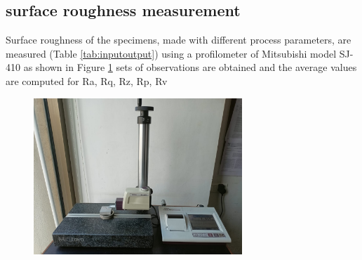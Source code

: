 \documentclass[suppldata]{interact}
\begin{document}
\newpage 
\subsection {surface roughness measurement}
  Surface roughness of the specimens, made with different process parameters, are measured (Table \ref{tab:inputoutput})  using a profilometer of Mitsubishi model SJ-410 as shown in Figure \ref{fig:profilometer} sets of observations are obtained and the average values are computed for Ra, Rq, Rz, Rp, Rv 
\begin{figure}[htbp]
    \begin{minipage}{0.7\textwidth}
        \centering
        \includegraphics[width=0.7\textwidth]{MMP_profilometer_pdpu.jpg}
        \label{fig:profilometer}
    \end{minipage}
 \end{figure}
\end{document}
